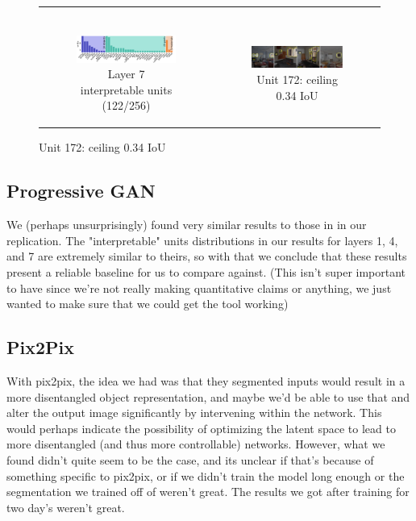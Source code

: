 \documentclass{article}
\begin{document}
\begin{figure}[h!]
\begin{tabular}{c c }
\begin{subfigure}[h!]{0.4\textwidth}
    \end{subfigure} \\
    \begin{subfigure}[h!]{0.6\textwidth}
        \caption{Layer 7 interpretable units (122/256)}
        \includegraphics[scale=0.33]{pg_layer11.png}
    \end{subfigure} &
    \begin{subfigure}[h!]{0.4\textwidth}
        \caption{Unit 172: ceiling 0.34 IoU}
        \includegraphics[scale=0.16]{images/pg_layer7_u172_ceil_0.34.png}
    \end{subfigure} \\
\end{tabular}
\end{figure}
\subsection{Progressive GAN}
We (perhaps unsurprisingly) found very similar results to those in \cite{gandissect} in our replication. The "interpretable" units distributions in our results for layers 1, 4, and 7 are extremely similar to theirs, so with that we conclude that these results present a reliable baseline for us to compare against. (This isn't super important to have since we're not really making quantitative claims or anything, we just wanted to make sure that we could get the tool working)

\subsection{Pix2Pix}
With pix2pix, the idea we had was that they segmented inputs would result in a more disentangled object representation, and maybe we'd be able to use that and alter the output image significantly by intervening within the network. This would perhaps indicate the possibility of optimizing the latent space to lead to more disentangled (and thus more controllable) networks. However, what we found didn't quite seem to be the case, and its unclear if that's because of something specific to pix2pix, or if we didn't train the model long enough or the segmentation we trained off of weren't great. The results we got after training for two day's weren't great.
\end{document}
